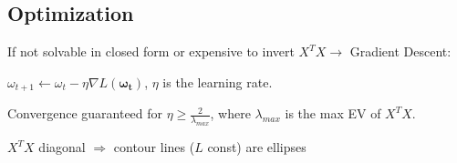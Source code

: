 \subsection{Optimization}

    If not solvable in closed form or expensive to invert $X^TX\rightarrow$ Gradient Descent:
    
    $\omega_{t+1} \leftarrow \omega_t - \eta \nabla L(\boldsymbol{\omega_t})$, $\eta$ is the learning rate.
    
    Convergence guaranteed for $\eta \geq \frac{2}{\lambda_{max}}$, where $\lambda_{max}$ is the max EV of $X^TX$. 
    
    $X^TX$ diagonal $\Rightarrow$ contour lines ($L$ const) are ellipses
    
    